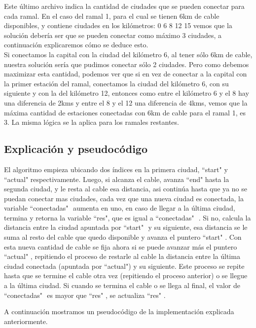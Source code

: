 Este último archivo indica la cantidad de ciudades que se pueden conectar para cada ramal. En el caso del ramal 1, para el cual se tienen 6km de cable disponibles, y contiene ciudades en los kilómetros: 0 6 8 12 15 vemos que la solución debería ser que se pueden conectar como máximo 3 ciudades, a continuación explicaremos cómo se deduce esto.\\

Si conectamos la capital con la ciudad del kilómetro 6, al tener sólo 6km de cable, nuestra solución sería que pudimos conectar sólo 2 ciudades. Pero como debemos maximizar esta cantidad, podemos ver que si en vez de conectar a la capital con la primer estación del ramal, conectamos la ciudad del kilómetro 6, con su siguiente y con la del kilómetro 12, entonces como entre el kilómetro 6 y el 8 hay una diferencia de 2kms y entre el 8 y el 12 una diferencia de 4kms, vemos que la máxima cantidad de estaciones conectadas con 6km de cable para el ramal 1, es 3. La misma lógica se la aplica para los ramales restantes.\\

\subsection{Explicación y pseudocódigo}

El algoritmo empieza ubicando dos índices en la primera ciudad, ``start" $ $y ``actual" $ $respectivamente. Luego, si alcanza el cable, avanza ``end"$ $ hasta la segunda ciudad, y le resta al cable esa distancia, asi continúa hasta que ya no se puedan conectar mas ciudades, cada vez que una nueva ciudad es conectada, la variable ``conectadas" $ $ aumenta en uno, en caso de llegar a la última ciudad, termina y retorna la variable ``res"$ $, que es igual a ``$ $conectadas" $ $ . Si no, calcula la distancia entre la ciudad apuntada por ``start" $ $ y su siguiente, esa distancia se le suma al resto del cable que quedo disponible y avanza el puntero ``start" $ $. Con esta nueva cantidad de cable se fija ahora si se puede avanzar más el puntero ``actual"$ $ , repitiendo el proceso de restarle al cable la distancia entre la última ciudad conectada (apuntada por ``actual"$ $) y su siguiente. Este proceso se repite hasta que se termine el cable otra vez (repitiendo el proceso anterior) o se llegue a la última ciudad. Si cuando se termina el cable o se llega al final, el valor de ``conectadas" $ $ es mayor que ``res" $ $, se actualiza ``res" $ $.

A continuación mostramos un pseudocódigo de la implementación explicada anteriormente. \\

